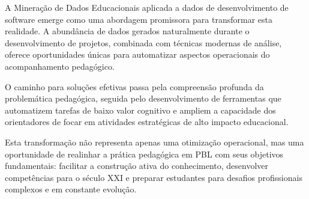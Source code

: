 \documentclass[english, spanish, brazilian]{RBIEarticle} %
\begin{document}
A Mineração de Dados Educacionais aplicada a dados de desenvolvimento de software emerge como uma abordagem promissora para transformar esta realidade. A abundância de dados gerados naturalmente durante o desenvolvimento de projetos, combinada com técnicas modernas de análise, oferece oportunidades únicas para automatizar aspectos operacionais do acompanhamento pedagógico.

O caminho para soluções efetivas passa pela compreensão profunda da problemática pedagógica, seguida pelo desenvolvimento de ferramentas que automatizem tarefas de baixo valor cognitivo e ampliem a capacidade dos orientadores de focar em atividades estratégicas de alto impacto educacional.

Esta transformação não representa apenas uma otimização operacional, mas uma oportunidade de realinhar a prática pedagógica em PBL com seus objetivos fundamentais: facilitar a construção ativa do conhecimento, desenvolver competências para o século XXI e preparar estudantes para desafios profissionais complexos e em constante evolução.




\end{document}
